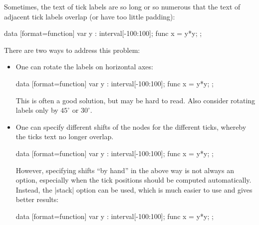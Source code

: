 \label{section-dv-stacking}



Sometimes, the text of tick labels are so long or so numerous that the
text of adjacent tick labels overlap (or have too little padding):
\begin{codeexample}[]
\tikz \datavisualization [scientific axes,
                          all axes={length=2.5cm},
                          visualize as smooth line]
  data [format=function] {
    var y : interval[-100:100];
    func x = \value y*\value y;
  };
\end{codeexample}
There are two ways to address this problem:
\begin{itemize}
\item One can rotate the labels on horizontal axes:
\begin{codeexample}[]
\tikz \datavisualization [scientific axes,
                          all axes={length=2.5cm},
                          x axis={ticks={node style={rotate=90, anchor=east}}},
                          visualize as smooth line]
  data [format=function] {
    var y : interval[-100:100];
    func x = \value y*\value y;
  };
\end{codeexample}
  This is often a good solution, but may be hard to read. Also
  consider rotating labels only by $45^\circ$ or $30^\circ$.
\item One can specify different shifts of the nodes for the different
  ticks, whereby the ticks text no longer overlap.
\begin{codeexample}[]
\tikz \datavisualization [scientific axes,
                          all axes={length=2.5cm},
                          x axis={ticks={major at={0,4000,8000,
                                2000 as [node style={yshift=-1em}],
                                6000 as [node style={yshift=-1em}],
                                10000 as [node style={yshift=-1em}]}}},
                          visualize as smooth line]
  data [format=function] {
    var y : interval[-100:100];
    func x = \value y*\value y;
  };
\end{codeexample}
  However, specifying shifts ``by hand'' in the above way is not
  always an option, especially when the tick positions should be
  computed automatically. Instead, the |stack| option can be used,
  which is much easier to use and gives better results:
\begin{codeexample}[]
\tikz \datavisualization [scientific axes,
                          all axes={length=2.5cm}, x axis={ticks=stack},
                          visualize as smooth line]
  data [format=function] {
    var y : interval[-100:100];
    func x = \value y*\value y;
  };
\end{codeexample}
\end{itemize}


